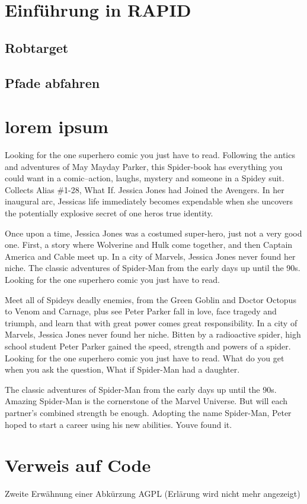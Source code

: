 \section{Einführung in RAPID}

\subsection{Robtarget}
\subsection{Pfade abfahren}


\section{lorem ipsum}
Looking for the one superhero comic you just have to read. Following the antics and adventures of May Mayday Parker, this Spider-book has everything you could want in a comic--action, laughs, mystery and someone in a Spidey suit. Collects Alias \#1-28, What If. Jessica Jones had Joined the Avengers. In her inaugural arc, Jessicas life immediately becomes expendable when she uncovers the potentially explosive secret of one heros true identity. 

Once upon a time, Jessica Jones was a costumed super-hero, just not a very good one. First, a story where Wolverine and Hulk come together, and then Captain America and Cable meet up. In a city of Marvels, Jessica Jones never found her niche. The classic adventures of Spider-Man from the early days up until the 90s. Looking for the one superhero comic you just have to read.

Meet all of Spideys deadly enemies, from the Green Goblin and Doctor Octopus to Venom and Carnage, plus see Peter Parker fall in love, face tragedy and triumph, and learn that with great power comes great responsibility. In a city of Marvels, Jessica Jones never found her niche. Bitten by a radioactive spider, high school student Peter Parker gained the speed, strength and powers of a spider. Looking for the one superhero comic you just have to read. What do you get when you ask the question, What if Spider-Man had a daughter.

The classic adventures of Spider-Man from the early days up until the 90s. Amazing Spider-Man is the cornerstone of the Marvel Universe. But will each partner’s combined strength be enough. Adopting the name Spider-Man, Peter hoped to start a career using his new abilities. Youve found it.

\section{Verweis auf Code}


Zweite Erwähnung einer Abkürzung \ac{AGPL} (Erlärung wird nicht mehr angezeigt)